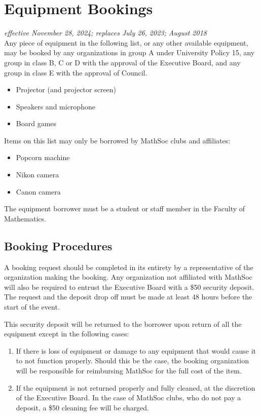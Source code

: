 \section{Equipment Bookings}
\emph{effective November 28, 2024; replaces July 26, 2023; August 2018}\\

Any piece of equipment in the following list, or any other available equipment,
may be booked by any organizations in group A under University Policy 15, any
group in class B, C or D with the approval of the Executive Board, and any
group in class E with the approval of Council.

\begin{itemize}
	\item Projector (and projector screen)
	\item Speakers and microphone
	\item Board games
\end{itemize}

Items on this list may only be borrowed by MathSoc clubs and affiliates:

\begin{itemize}
	\item Popcorn machine
	\item Nikon camera
	\item Canon camera
\end{itemize}

The equipment borrower must be a student or staff member in the Faculty of Mathematics.

\subsection{Booking Procedures}

A booking request should be completed in its entirety by a
representative of the organization making the booking. Any organization not
affiliated with MathSoc will also be required to entrust the Executive Board
with a \$50 security deposit. The request and the deposit drop off must be made
at least 48 hours before the start of the event.

This security deposit will be returned to the borrower upon return of all the
equipment except in the following cases:

\begin{enumerate}
	\item If there is loss of equipment or damage to any equipment that would cause it to not function
	      properly. Should this be the case, the booking organization will be
	      responsible for reimbursing MathSoc for the full cost of the item.
	\item If the equipment is not returned properly and fully cleaned, at the
	      discretion of the Executive Board. In the case of MathSoc clubs, who do not
	      pay a deposit, a \$50 cleaning fee will be charged.
\end{enumerate}

